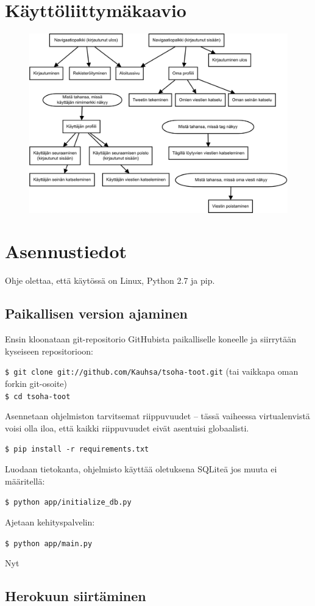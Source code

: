 \documentclass{article}
\let\stdsection\section
\renewcommand\section{\newpage\stdsection}
\begin{document}
\section{Käyttöliittymäkaavio}
\begin{figure}[H]
    \centering
    \includegraphics[width=\textwidth]{navigaatio.pdf}
\end{figure}

\section{Asennustiedot}
Ohje olettaa, että käytössä on Linux, Python 2.7 ja pip.

\subsection{Paikallisen version ajaminen}
Ensin kloonataan git-repositorio GitHubista paikalliselle koneelle ja siirrytään kyseiseen repositorioon:

\texttt{\$ git clone git://github.com/Kauhsa/tsoha-toot.git} (tai vaikkapa oman forkin git-osoite) \\
\texttt{\$ cd tsoha-toot}

Asennetaan ohjelmiston tarvitsemat riippuvuudet -- tässä vaiheessa virtualenvistä voisi olla iloa, että kaikki riippuvuudet eivät asentuisi globaalisti.

\texttt{\$ pip install -r requirements.txt}

Luodaan tietokanta, ohjelmisto käyttää oletuksena SQLiteä jos muuta ei määritellä:

\texttt{\$ python app/initialize\_db.py}

Ajetaan kehityspalvelin:

\texttt{\$ python app/main.py}

Nyt

\subsection{Herokuun siirtäminen}
\end{document}
